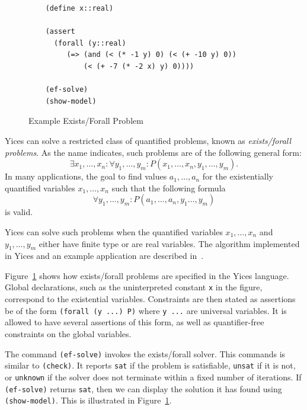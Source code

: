 \documentclass[11pt,twoside,fleqn,openright,titlepage]{cslreport}
\begin{document}
\begin{figure}
\begin{footnotesize}
\begin{verbatim}
    (define x::real)

    (assert 
      (forall (y::real)
         (=> (and (< (* -1 y) 0) (< (+ -10 y) 0))
             (< (+ -7 (* -2 x) y) 0))))

    (ef-solve)
    (show-model)
\end{verbatim}
\end{footnotesize}
\caption{Example Exists/Forall Problem}
\label{example:ef}
\end{figure}

Yices can solve a restricted class of quantified problems, known as
\emph{exists/forall problems\/}. As the name indicates, such
problems are of the following general form:
$$\exists x_1,\ldots,x_n:\forall
y_1,\ldots,y_m: P(x_1,\ldots,x_n,y_1,\ldots,y_m).$$ In many
applications, the goal to find values $a_1,\ldots,a_n$ for the
existentially quantified variables $x_1,\ldots,x_n$ such that the
following formula $$\forall
y_1,\ldots,y_m: P(a_1,\ldots,a_n,y_1\ldots,y_m)$$ is valid.

\medskip\noindent
Yices can solve such problems when the quantified variables
$x_1,\ldots,x_n$ and $y_1,\ldots,y_m$ either have finite type or are
real variables. The algorithm implemented in Yices and an example
application are described in~\cite{Gascon+etal:fmcad2014}.

\medskip\noindent Figure~\ref{example:ef} shows how exists/forall
problems are specified in the Yices language. Global declarations,
such as the uninterpreted constant \texttt{x} in the figure,
correspond to the existential variables.  Constraints are then stated
as assertions be of the form \texttt{(forall (y ...) P)} where
\texttt{y ...} are universal variables. It is allowed to have several
assertions of this form, as well as quantifier-free constraints on the
global variables.

\medskip\noindent
The command \texttt{(ef-solve)} invokes the exists/forall solver. This
commands is similar to \texttt{(check)}. It reports \texttt{sat} if
the problem is satisfiable, \texttt{unsat} if it is not, or
\texttt{unknown} if the solver does not terminate within a fixed
number of iterations. If \texttt{(ef-solve)} returns \texttt{sat},
then we can display the solution it has found using \texttt{(show-model)}.
This is illustrated in Figure~\ref{example:ef}.
\end{document}
